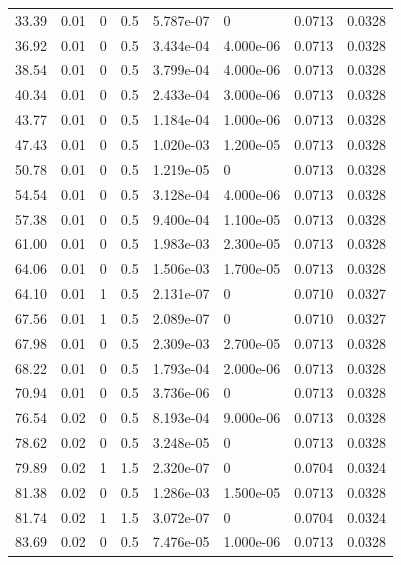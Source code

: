 \documentclass[preview]{standalone}
\begin{document}
{{\begin{tabular}{L{1.2cm}C{1.2cm} C{0.3cm}C{0.5cm} C{1.4cm}C{1.4cm} C{1.4cm}C{1.4cm}}
  33.39  &  0.01  & 0     & 0.5 &  5.787e-07  & 0  & 0.0713 &  0.0328   \\ 
  36.92  &  0.01  & 0     & 0.5 &  3.434e-04  & 4.000e-06  & 0.0713 &  0.0328   \\ 
  38.54  &  0.01  & 0     & 0.5 &  3.799e-04  & 4.000e-06  & 0.0713 &  0.0328   \\ 
  40.34  &  0.01  & 0     & 0.5 &  2.433e-04  & 3.000e-06  & 0.0713 &  0.0328   \\ 
  43.77  &  0.01  & 0     & 0.5 &  1.184e-04  & 1.000e-06  & 0.0713 &  0.0328   \\ 
  47.43  &  0.01  & 0     & 0.5 &  1.020e-03  & 1.200e-05  & 0.0713 &  0.0328   \\ 
  50.78  &  0.01  & 0     & 0.5 &  1.219e-05  & 0  & 0.0713 &  0.0328   \\ 
  54.54  &  0.01  & 0     & 0.5 &  3.128e-04  & 4.000e-06  & 0.0713 &  0.0328   \\ 
  57.38  &  0.01  & 0     & 0.5 &  9.400e-04  & 1.100e-05  & 0.0713 &  0.0328   \\ 
  61.00  &  0.01  & 0     & 0.5 &  1.983e-03  & 2.300e-05  & 0.0713 &  0.0328   \\ 
  64.06  &  0.01  & 0     & 0.5 &  1.506e-03  & 1.700e-05  & 0.0713 &  0.0328   \\ 
  64.10  &  0.01  & 1     & 0.5 &  2.131e-07  & 0  & 0.0710 &  0.0327   \\ 
  67.56  &  0.01  & 1     & 0.5 &  2.089e-07  & 0  & 0.0710 &  0.0327   \\ 
  67.98  &  0.01  & 0     & 0.5 &  2.309e-03  & 2.700e-05  & 0.0713 &  0.0328   \\ 
  68.22  &  0.01  & 0     & 0.5 &  1.793e-04  & 2.000e-06  & 0.0713 &  0.0328   \\ 
  70.94  &  0.01  & 0     & 0.5 &  3.736e-06  & 0  & 0.0713 &  0.0328   \\ 
  76.54  &  0.02  & 0     & 0.5 &  8.193e-04  & 9.000e-06  & 0.0713 &  0.0328   \\ 
  78.62  &  0.02  & 0     & 0.5 &  3.248e-05  & 0  & 0.0713 &  0.0328   \\ 
  79.89  &  0.02  & 1     & 1.5 &  2.320e-07  & 0  & 0.0704 &  0.0324   \\ 
  81.38  &  0.02  & 0     & 0.5 &  1.286e-03  & 1.500e-05  & 0.0713 &  0.0328   \\ 
  81.74  &  0.02  & 1     & 1.5 &  3.072e-07  & 0  & 0.0704 &  0.0324   \\ 
  83.69  &  0.02  & 0     & 0.5 &  7.476e-05  & 1.000e-06  & 0.0713 &  0.0328   \\ 

\end{tabular}}}
\end{document}
